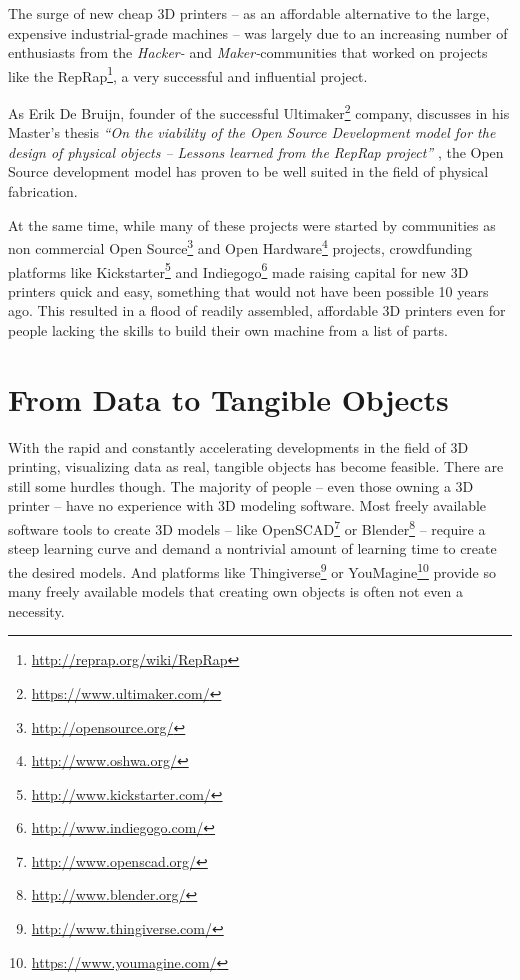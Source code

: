 
\noindent The surge of new cheap 3D printers -- as an affordable alternative to
the large, expensive industrial-grade machines -- was largely due to an
increasing number of enthusiasts from the \emph{Hacker-} and
\emph{Maker-}communities that worked on projects like the
RepRap\footnote{\url{http://reprap.org/wiki/RepRap}}, a very successful and
influential project.

As Erik De Bruijn, founder of the successful
Ultimaker\footnote{\url{https://www.ultimaker.com/}} company, discusses in his
Master's thesis \textit{``On the viability of the Open Source Development model
for the design of physical objects -- Lessons learned from the RepRap project''}
\cite{bruijn:2010}, the Open Source development model has proven to be well
suited in the field of physical fabrication.

At the same time, while many of these projects were started by communities as
non commercial Open Source\footnote{\url{http://opensource.org/}} and Open
Hardware\footnote{\url{http://www.oshwa.org/}} projects, crowdfunding platforms
like Kickstarter\footnote{\url{http://www.kickstarter.com/}} and
Indiegogo\footnote{\url{http://www.indiegogo.com/}} made raising capital for new
3D printers quick and easy, something that would not have been possible 10 years
ago. This resulted in a flood of readily assembled, affordable 3D printers even
for people lacking the skills to build their own machine from a list of parts.


\section{From Data to Tangible Objects}

With the rapid and constantly accelerating developments in the field of 3D
printing, visualizing data as real, tangible objects has become feasible. There
are still some hurdles though.  The majority of people -- even those owning a 3D
printer -- have no experience with 3D modeling software. Most freely available
software tools to create 3D models -- like
OpenSCAD\footnote{\url{http://www.openscad.org/}} or
Blender\footnote{\url{http://www.blender.org/}} -- require a steep learning
curve and demand a nontrivial amount of learning time to create the desired
models. And platforms like
Thingiverse\footnote{\url{http://www.thingiverse.com/}} or
YouMagine\footnote{\url{https://www.youmagine.com/}} provide so many freely
available models that creating own objects is often not even a necessity.

